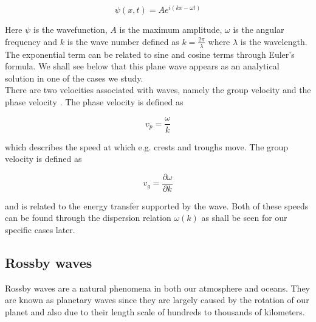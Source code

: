 \documentclass[12pt]{article}
\numberwithin{figure}{section}
\numberwithin{table}{section}
\begin{document}
\begin{equation}
    \psi (x, t) = A e^{i(kx -\omega t)}
    \label{GeneralWave}
\end{equation}


\noindent Here $\psi$ is the wavefunction, $A$ is the maximum amplitude, $\omega$ is the angular frequency and $k$ is the wave number defined as $k=\frac{2\pi}{\lambda}$ where $\lambda$ is the wavelength. The exponential term can be related to sine and cosine terms through Euler's formula. We shall see below that this plane wave appears as an analytical solution in one of the cases we study.\\

\noindent There are two velocities associated with waves, namely the group velocity and the phase velocity \cite{fluid_dynamics_notes}. The phase velocity is defined as

\begin{equation}
	v_p = \frac{\omega}{k}
    \label{PhaseVelocity}
\end{equation}

\noindent which describes the speed at which e.g. crests and troughs move. The group velocity is defined as

\begin{equation}
	v_g = \frac{\partial \omega}{\partial k}
    \label{GroupVelocity}
\end{equation}

\noindent and is related to the energy transfer supported by the wave. Both of these speeds can be found through the dispersion relation $\omega(k)$ as shall be seen for our specific cases later. \\



\subsection{Rossby waves} \label{sec:Rossby}


\noindent Rossby waves are a natural phenomena in both our atmosphere and oceans. They are known as planetary waves since they are largely caused by the rotation of our planet and also due to their length scale of hundreds to thousands of kilometers. \\ 

\end{document}
